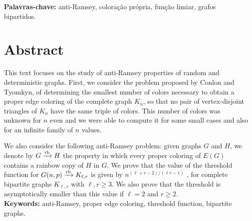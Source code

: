 \documentclass[12pt,a4paper]{book}
\newcommand{\K}{K_{\ell,r}} %
\def\rbarrow{\xrightarrow[]{\raisebox{0.0mm}[0mm]{$\scriptstyle \rm rb$}}}
\begin{document}
\noindent \textbf{Palavras-chave:} anti-Ramsey, coloração própria, função limiar, grafos bipartidos.

\chapter*{Abstract}

This text focuses on the study of anti-Ramsey properties of random and deterministic graphs.
  First, we consider the problem proposed by Conlon and Tyomkyn, of determining the smallest number of colors necessary to obtain a proper edge coloring of the complete graph $K_n$, so that no pair of vertex-disjoint triangles of $K_n$ have the same triple of colors.
This number of colors was unknown for $n$ even and we were able to compute it for some small cases and also for an infinite family of $n$ values.

We also consider the following anti-Ramsey problem: given graphs $G$ and $H$, we denote by $G \rbarrow H$ the property in which every proper coloring of $E(G)$ contains a rainbow copy of $H $ in $G$.
We prove that the value of the threshold function for $G(n,p) \rbarrow K_{\ell,r}$ is given by $n^{(\ell+r-2)/(\ell r-1)}$ , for complete bipartite graphs $\K$ with $\ell,r \geq 3$. We also prove that the threshold is asymptotically smaller than this value if $\ell=2$ and $r\geq 2$.
\\

\noindent \textbf{Keywords:} anti-Ramsey, proper edge coloring, threshold function, bipartite graphs.

\tableofcontents    %

\listoffigures            

\mainmatter
\end{document}
